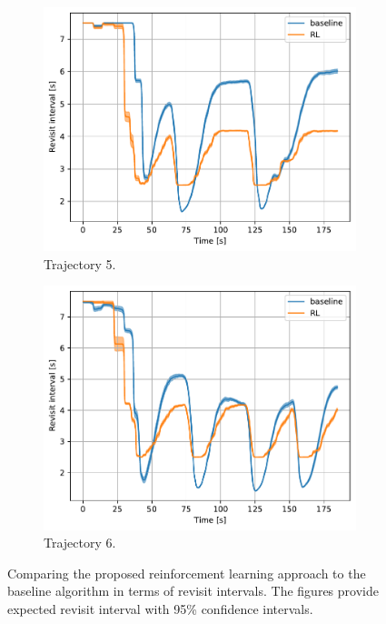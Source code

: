 \documentclass[english, 12pt, a4paper, elec, utf8, a-1b, online]{aaltothesis}
\begin{document}
\begin{figure}[htb]
\begin{subfigure}[b]{0.45\textwidth}
        \centering
        \includegraphics[width=\linewidth]{figures/benchmark/Simulations/revisit_intervals_4.pdf}
        \caption{Trajectory 5.}
        \label{fig:TL_T5}
    \end{subfigure}
    \hfill
    \begin{subfigure}[b]{0.45\textwidth}
        \centering
        \includegraphics[width=\linewidth]{figures/benchmark/Simulations/revisit_intervals_5.pdf}
        \caption{Trajectory 6.}
        \label{fig:TL_T6}
    \end{subfigure}
    \caption{Comparing the proposed reinforcement learning approach to the baseline algorithm in terms of revisit intervals.
    The figures provide expected revisit interval with 95\% confidence intervals.}
    \label{fig:revisit_interval_comparison}
\end{figure}
\end{document}
